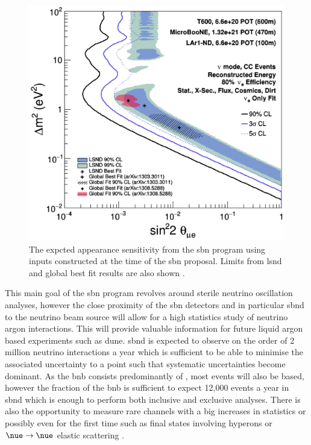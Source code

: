 \begin{figure}
    \centering
    \includegraphics[width = \largefigwidth]{figures-chap3/SBN_proposal_sensitivity.png}
    \caption[\nue appearance\gls{sbn} proposal sensitivity.]{The expcted \nue appearance sensitivity from the \gls{sbn} program using inputs constructed at the time of the \gls{sbn} proposal. Limits from \gls{lsnd} and global best fit results are also shown \cite{SBN_Proposal}.}
    \label{fig:SBN_proposal_sensitivity}
\end{figure}

This main goal of the \gls{sbn} program revolves around sterile neutrino oscillation analyses, however the close proximity of the \gls{sbn} detectors and in particular \gls{sbnd} to the neutrino beam source will allow for a high statistics study of neutrino argon interactions. This will provide valuable information for future liquid argon based experiments such as \gls{dune}. \gls{sbnd} is expected to observe on the order of 2 million neutrino interactions a year which is sufficient to be able to minimise the associated uncertainty to a point such that systematic uncertainties become dominant. As the \gls{bnb} consists predominantly of \numu, most events will also be \numu based, however the \nue fraction of the \gls{bnb} is sufficient to expect 12,000 \nue events a year in \gls{sbnd} which is enough to perform both inclusive and exclusive analyses. There is also the opportunity to measure rare channels with a big increases in statistics or possibly even for the first time such as final states involving hyperons or $\nue \rightarrow \nue$ elastic scattering \cite{SBN_paper} \cite{light_dark_matter}.

